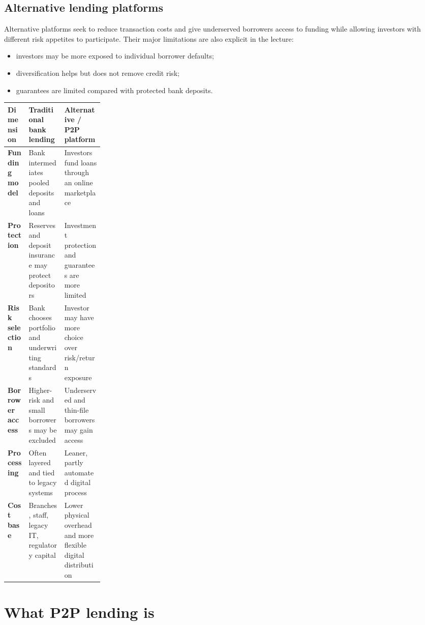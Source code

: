 \subsection{Alternative lending platforms}

Alternative platforms seek to reduce transaction costs and give underserved borrowers access to funding while allowing investors with different risk appetites to participate. Their major limitations are also explicit in the lecture:

\begin{itemize}
  \item investors may be more exposed to individual borrower defaults;
  \item diversification helps but does not remove credit risk;
  \item guarantees are limited compared with protected bank deposits.
\end{itemize}

\begin{mltable}
\begin{tabularx}{\linewidth}{@{}>{\bfseries\leavevmode\color{MLNavy}}p{0.22\linewidth}XX@{}}
\toprule
\rowcolor{MLPaleBlue!92}
Dimension & Traditional bank lending & Alternative / P2P platform \\
\midrule
Funding model & Bank intermediates pooled deposits and loans & Investors fund loans through an online marketplace \\
Protection & Reserves and deposit insurance may protect depositors & Investment protection and guarantees are more limited \\
Risk selection & Bank chooses portfolio and underwriting standards & Investor may have more choice over risk/return exposure \\
Borrower access & Higher-risk and small borrowers may be excluded & Underserved and thin-file borrowers may gain access \\
Processing & Often layered and tied to legacy systems & Leaner, partly automated digital process \\
Cost base & Branches, staff, legacy IT, regulatory capital & Lower physical overhead and more flexible digital distribution \\
\bottomrule
\end{tabularx}
\end{mltable}

\section{What P2P lending is}

